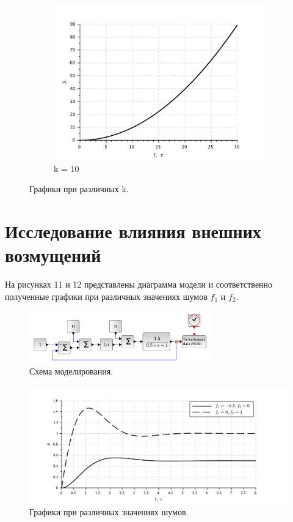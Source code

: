 \documentclass[a4paper, 11pt]{article}
\begin{document}
\begin{figure}[h!]
    \centering
    \begin{subfigure}{0.5\textwidth}
        \centering
        \includegraphics[width = \textwidth]{images/graph2-3-K10.pdf}
        \caption{k = 10}
    \end{subfigure}
    \caption{Графики при различных k.}
\end{figure}

\newpage
\section*{Исследование влияния внешних возмущений}
На рисунках 11 и 12 представлены диаграмма модели и соответственно полученные графики при различных значениях шумов $f_1$ и $f_2$.

\begin{figure}[h!]
    \centering
    \includegraphics[width = 0.7\textwidth]{images/model3.pdf}
    \caption{Схема моделирования.}
\end{figure}
\begin{figure}[h!]
    \centering
    \includegraphics[width = \textwidth]{images/graph3.pdf}
    \caption{Графики при различных значениях шумов.}
\end{figure}
\end{document}
